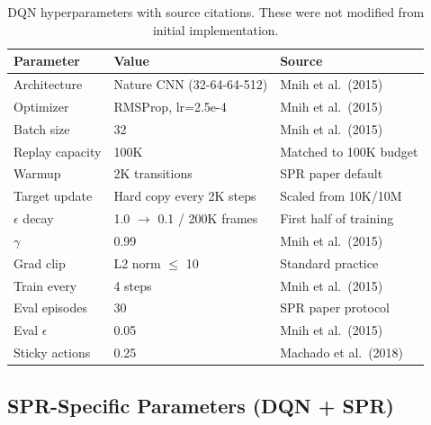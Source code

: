 \documentclass[11pt]{article}
\begin{document}
\begin{table}[H]
\centering
\small
\renewcommand{\arraystretch}{1.5}
\setlength{\tabcolsep}{5pt}
\begin{tabular}{l l l}
\toprule
\textbf{Parameter} & \textbf{Value} & \textbf{Source} \\
\midrule
Architecture   & Nature CNN (32-64-64-512) & Mnih et al.\ (2015) \\
Optimizer      & RMSProp, lr=2.5e-4        & Mnih et al.\ (2015) \\
Batch size     & 32                        & Mnih et al.\ (2015) \\
Replay capacity& 100K                      & Matched to 100K budget \\
Warmup         & 2K transitions            & SPR paper default \\
Target update  & Hard copy every 2K steps  & Scaled from 10K/10M \\
$\epsilon$ decay& 1.0 $\to$ 0.1 / 200K frames & First half of training \\
$\gamma$       & 0.99                      & Mnih et al.\ (2015) \\
Grad clip      & L2 norm $\leq$ 10         & Standard practice \\
Train every    & 4 steps                   & Mnih et al.\ (2015) \\
Eval episodes  & 30                        & SPR paper protocol \\
Eval $\epsilon$& 0.05                      & Mnih et al.\ (2015) \\
Sticky actions & 0.25                      & Machado et al.\ (2018) \\
\bottomrule
\end{tabular}
\caption{DQN hyperparameters with source citations. These were not
modified from initial implementation.}
\label{tab:dqn-params}
\end{table}

\subsection{SPR-Specific Parameters (DQN + SPR)}
\end{document}
